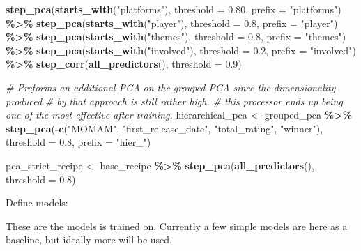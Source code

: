 \documentclass[
]{article}
\newenvironment{Shaded}{\begin{snugshade}}{\end{snugshade}}
\newcommand{\AttributeTok}[1]{\textcolor[rgb]{0.13,0.29,0.53}{#1}}
\newcommand{\CommentTok}[1]{\textcolor[rgb]{0.56,0.35,0.01}{\textit{#1}}}
\newcommand{\FloatTok}[1]{\textcolor[rgb]{0.00,0.00,0.81}{#1}}
\newcommand{\FunctionTok}[1]{\textcolor[rgb]{0.13,0.29,0.53}{\textbf{#1}}}
\newcommand{\NormalTok}[1]{#1}
\newcommand{\OtherTok}[1]{\textcolor[rgb]{0.56,0.35,0.01}{#1}}
\newcommand{\SpecialCharTok}[1]{\textcolor[rgb]{0.81,0.36,0.00}{\textbf{#1}}}
\newcommand{\StringTok}[1]{\textcolor[rgb]{0.31,0.60,0.02}{#1}}
\begin{document}
\begin{Shaded}
\begin{Highlighting}[]
  \FunctionTok{step\_pca}\NormalTok{(}\FunctionTok{starts\_with}\NormalTok{(}\StringTok{"platforms"}\NormalTok{), }\AttributeTok{threshold =} \FloatTok{0.80}\NormalTok{, }\AttributeTok{prefix =} \StringTok{"platforms"}\NormalTok{) }\SpecialCharTok{\%\textgreater{}\%}
  \FunctionTok{step\_pca}\NormalTok{(}\FunctionTok{starts\_with}\NormalTok{(}\StringTok{"player"}\NormalTok{), }\AttributeTok{threshold =} \FloatTok{0.8}\NormalTok{, }\AttributeTok{prefix =} \StringTok{"player"}\NormalTok{) }\SpecialCharTok{\%\textgreater{}\%}
  \FunctionTok{step\_pca}\NormalTok{(}\FunctionTok{starts\_with}\NormalTok{(}\StringTok{"themes"}\NormalTok{), }\AttributeTok{threshold =} \FloatTok{0.8}\NormalTok{, }\AttributeTok{prefix =} \StringTok{"themes"}\NormalTok{) }\SpecialCharTok{\%\textgreater{}\%}
  \FunctionTok{step\_pca}\NormalTok{(}\FunctionTok{starts\_with}\NormalTok{(}\StringTok{"involved"}\NormalTok{), }\AttributeTok{threshold =} \FloatTok{0.2}\NormalTok{, }\AttributeTok{prefix =} \StringTok{"involved"}\NormalTok{) }\SpecialCharTok{\%\textgreater{}\%}
  \FunctionTok{step\_corr}\NormalTok{(}\FunctionTok{all\_predictors}\NormalTok{(), }\AttributeTok{threshold =} \FloatTok{0.9}\NormalTok{)}

\CommentTok{\# Preforms an additional PCA on the grouped PCA since the dimensionality produced}
\CommentTok{\# by that approach is still rather high.}
\CommentTok{\# this processor ends up being one of the most effective after training.}
\NormalTok{hierarchical\_pca }\OtherTok{\textless{}{-}}\NormalTok{ grouped\_pca }\SpecialCharTok{\%\textgreater{}\%}
  \FunctionTok{step\_pca}\NormalTok{(}\SpecialCharTok{{-}}\FunctionTok{c}\NormalTok{(}\StringTok{"MOMAM"}\NormalTok{, }\StringTok{"first\_release\_date"}\NormalTok{, }\StringTok{"total\_rating"}\NormalTok{, }\StringTok{"winner"}\NormalTok{),}
           \AttributeTok{threshold =} \FloatTok{0.8}\NormalTok{, }\AttributeTok{prefix =} \StringTok{"hier\_"}\NormalTok{)}

\NormalTok{pca\_strict\_recipe }\OtherTok{\textless{}{-}}\NormalTok{ base\_recipe }\SpecialCharTok{\%\textgreater{}\%}
  \FunctionTok{step\_pca}\NormalTok{(}\FunctionTok{all\_predictors}\NormalTok{(), }\AttributeTok{threshold =} \FloatTok{0.8}\NormalTok{)}
\end{Highlighting}
\end{Shaded}

Define models:

These are the models is trained on. Currently a few simple models are
here as a baseline, but ideally more will be used.
\end{document}
